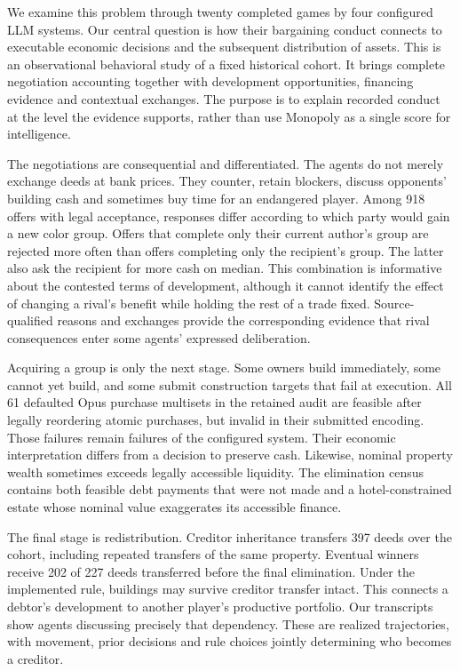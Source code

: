 \documentclass[11pt,letterpaper]{article}
\begin{document}
We examine this problem through twenty completed games by four configured LLM systems. Our central question is how their bargaining conduct connects to executable economic decisions and the subsequent distribution of assets. This is an observational behavioral study of a fixed historical cohort. It brings complete negotiation accounting together with development opportunities, financing evidence and contextual exchanges. The purpose is to explain recorded conduct at the level the evidence supports, rather than use Monopoly as a single score for intelligence.

The negotiations are consequential and differentiated. The agents do not merely exchange deeds at bank prices. They counter, retain blockers, discuss opponents' building cash and sometimes buy time for an endangered player. Among 918 offers with legal acceptance, responses differ according to which party would gain a new color group. Offers that complete only their current author's group are rejected more often than offers completing only the recipient's group. The latter also ask the recipient for more cash on median. This combination is informative about the contested terms of development, although it cannot identify the effect of changing a rival's benefit while holding the rest of a trade fixed. Source-qualified reasons and exchanges provide the corresponding evidence that rival consequences enter some agents' expressed deliberation.

Acquiring a group is only the next stage. Some owners build immediately, some cannot yet build, and some submit construction targets that fail at execution. All 61 defaulted Opus purchase multisets in the retained audit are feasible after legally reordering atomic purchases, but invalid in their submitted encoding. Those failures remain failures of the configured system. Their economic interpretation differs from a decision to preserve cash. Likewise, nominal property wealth sometimes exceeds legally accessible liquidity. The elimination census contains both feasible debt payments that were not made and a hotel-constrained estate whose nominal value exaggerates its accessible finance.

The final stage is redistribution. Creditor inheritance transfers 397 deeds over the cohort, including repeated transfers of the same property. Eventual winners receive 202 of 227 deeds transferred before the final elimination. Under the implemented rule, buildings may survive creditor transfer intact. This connects a debtor's development to another player's productive portfolio. Our transcripts show agents discussing precisely that dependency. These are realized trajectories, with movement, prior decisions and rule choices jointly determining who becomes a creditor.
\end{document}
